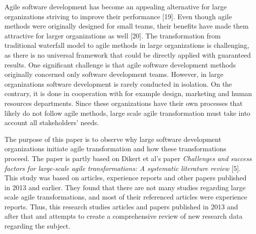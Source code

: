 Agile software development has become an appealing alternative for
large organizations striving to improve their performance [19].
Even though agile methods were originally designed for small teams,
their benefits have made them attractive for larger organizations as
well [20]. The transformation from traditional waterfall model to
agile methods in large organizations is challenging, as there is no
universal framework that could be directly applied with guaranteed
results. One significant challenge is that agile software development
methods originally concerned only software development teams. However,
in large organizations software development is rarely conducted in
isolation. On the contrary, it is done in cooperation with for
example design, marketing and human resources departments. Since these
organizations have their own processes that likely do not follow
agile methods, large scale agile transformation must take into account
all stakeholders' needs.

The purpose of this paper is to observe why large software
development organizations initiate agile transformation and how these
transformations proceed. The paper is partly based on Dikert et al's
paper \textit{Challenges and success factors for large-scale agile
transformations: A systematic literature review} [5]. This study was
based on articles, experience reports and other papers published in 2013
and earlier. They found that there are not many studies regarding large
scale agile transformations, and most of their referenced articles were
experience reports. Thus, this research studies articles and papers
published in 2013 and after that and attempts to create a comprehensive
review of new research data regarding the subject.
